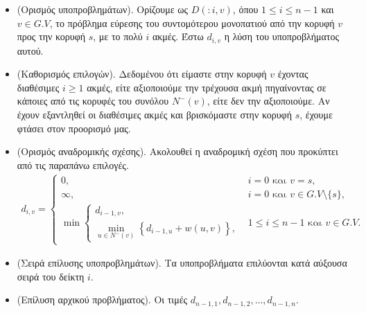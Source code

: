 \documentclass{article}
\begin{document}
\begin{itemize}
    \item (Ορισμός υποπροβλημάτων). Ορίζουμε ως $D(:i, v)$, όπου $1 \leq i \leq n - 1$ και $v \in G.V$, το πρόβλημα εύρεσης του συντομότερου μονοπατιού από την κορυφή $v$ προς την κορυφή $s$, με το πολύ $i$ ακμές. 
    Έστω $d_{i, v}$ η λύση του υποπροβλήματος αυτού.
     \item (Καθορισμός επιλογών). Δεδομένου ότι είμαστε στην κορυφή $v$ έχοντας διαθέσιμες $i \geq 1$ ακμές, είτε αξιοποιούμε την τρέχουσα ακμή πηγαίνοντας σε κάποιες από τις κορυφές του συνόλου $N^-(v)$,
     είτε δεν την αξιοποιούμε. Αν έχουν εξαντληθεί οι διαθέσιμες ακμές και βρισκόμαστε στην κορυφή $s$, έχουμε φτάσει στον προορισμό μας.
    \item  (Ορισμός αναδρομικής σχέσης). Ακολουθεί η αναδρομική σχέση που προκύπτει από τις παραπάνω επιλογές.
    \begin{align*}
        d_{i, v} = 
        \begin{cases}
            0, & i = 0 \text{ και } v = s, \\
            \infty, & i = 0 \text{ και } v \in G.V \setminus \{s\}, \\
            \min  
            \begin{cases}
                d_{i - 1, v}, \\
                \min_{u \in N^-(v)}\left\{d_{i - 1, u} + w(u, v)\right\}, 
            \end{cases}
            & 1\leq i \leq n - 1 \text{ και } v \in G.V.
        \end{cases}
    \end{align*}
    \item  (Σειρά επίλυσης υποπροβλημάτων). Τα υποπροβλήματα επιλύονται κατά αύξουσα σειρά του δείκτη $i$.
    \item (Επίλυση αρχικού προβλήματος). Οι τιμές $d_{n - 1, 1}, d_{n - 1, 2}, \dots, d_{n - 1, n}$.
\end{itemize}
\end{document}
